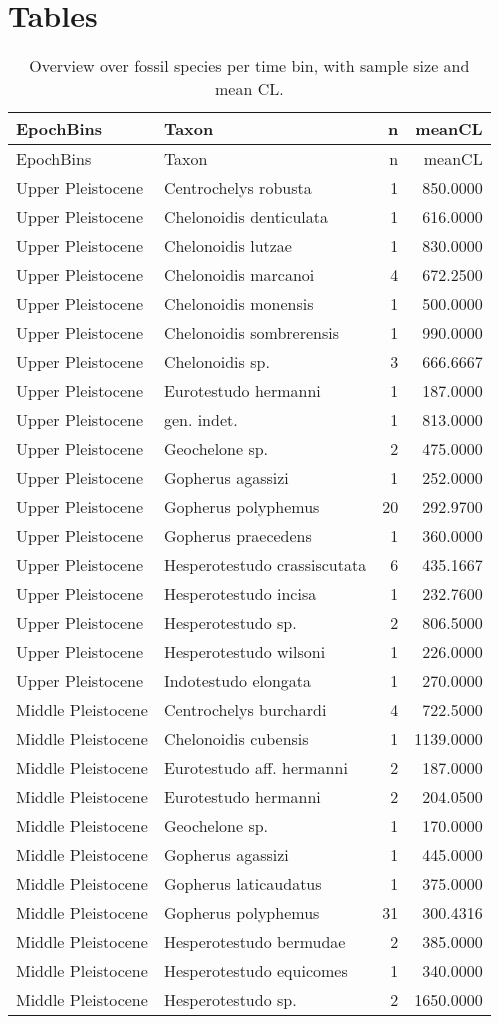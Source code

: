 \section*{Tables}
\begin{longtable}[]{@{}llrr@{}}
	\caption{Overview over fossil species per time bin, with sample size and
		mean CL.}
	\label{tab:SpecBins}\tabularnewline
	\toprule
	EpochBins & Taxon & n & meanCL\tabularnewline
	\midrule
	\endfirsthead
	\toprule
	EpochBins & Taxon & n & meanCL\tabularnewline
	\midrule
	\endhead
	Upper Pleistocene & Centrochelys robusta & 1 & 850.0000\tabularnewline
	Upper Pleistocene & Chelonoidis denticulata & 1 &
	616.0000\tabularnewline
	Upper Pleistocene & Chelonoidis lutzae & 1 & 830.0000\tabularnewline
	Upper Pleistocene & Chelonoidis marcanoi & 4 & 672.2500\tabularnewline
	Upper Pleistocene & Chelonoidis monensis & 1 & 500.0000\tabularnewline
	Upper Pleistocene & Chelonoidis sombrerensis & 1 &
	990.0000\tabularnewline
	Upper Pleistocene & Chelonoidis sp. & 3 & 666.6667\tabularnewline
	Upper Pleistocene & Eurotestudo hermanni & 1 & 187.0000\tabularnewline
	Upper Pleistocene & gen. indet. & 1 & 813.0000\tabularnewline
	Upper Pleistocene & Geochelone sp. & 2 & 475.0000\tabularnewline
	Upper Pleistocene & Gopherus agassizi & 1 & 252.0000\tabularnewline
	Upper Pleistocene & Gopherus polyphemus & 20 & 292.9700\tabularnewline
	Upper Pleistocene & Gopherus praecedens & 1 & 360.0000\tabularnewline
	Upper Pleistocene & Hesperotestudo crassiscutata & 6 &
	435.1667\tabularnewline
	Upper Pleistocene & Hesperotestudo incisa & 1 & 232.7600\tabularnewline
	Upper Pleistocene & Hesperotestudo sp. & 2 & 806.5000\tabularnewline
	Upper Pleistocene & Hesperotestudo wilsoni & 1 & 226.0000\tabularnewline
	Upper Pleistocene & Indotestudo elongata & 1 & 270.0000\tabularnewline
	Middle Pleistocene & Centrochelys burchardi & 4 &
	722.5000\tabularnewline
	Middle Pleistocene & Chelonoidis cubensis & 1 & 1139.0000\tabularnewline
	Middle Pleistocene & Eurotestudo aff. hermanni & 2 &
	187.0000\tabularnewline
	Middle Pleistocene & Eurotestudo hermanni & 2 & 204.0500\tabularnewline
	Middle Pleistocene & Geochelone sp. & 1 & 170.0000\tabularnewline
	Middle Pleistocene & Gopherus agassizi & 1 & 445.0000\tabularnewline
	Middle Pleistocene & Gopherus laticaudatus & 1 & 375.0000\tabularnewline
	Middle Pleistocene & Gopherus polyphemus & 31 & 300.4316\tabularnewline
	Middle Pleistocene & Hesperotestudo bermudae & 2 &
	385.0000\tabularnewline
	Middle Pleistocene & Hesperotestudo equicomes & 1 &
	340.0000\tabularnewline
	Middle Pleistocene & Hesperotestudo sp. & 2 & 1650.0000\tabularnewline

\end{longtable}
